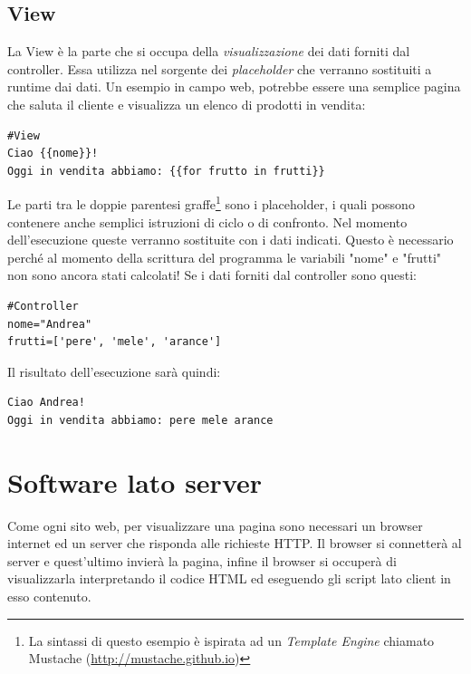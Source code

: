 \subsection{View}\label{sec:view}
La View è la parte che si occupa della \emph{visualizzazione} dei dati forniti dal controller. Essa utilizza nel sorgente dei \emph{placeholder} che verranno sostituiti a runtime dai dati.
Un esempio in campo web, potrebbe essere una semplice pagina che saluta il cliente e visualizza un elenco di prodotti in vendita:
\begin{lstlisting}
#View
Ciao {{nome}}!
Oggi in vendita abbiamo: {{for frutto in frutti}}
\end{lstlisting}
Le parti tra le doppie parentesi graffe\footnote{La sintassi di questo esempio è ispirata ad un \emph{Template Engine} chiamato Mustache (\url{http://mustache.github.io})} sono i placeholder, i quali possono contenere anche semplici istruzioni di ciclo o di confronto. Nel momento dell'esecuzione queste verranno sostituite con i dati indicati. Questo è necessario perché al momento della scrittura del programma le variabili "nome" e "frutti" non sono ancora stati calcolati!
Se i dati forniti dal controller sono questi:
\begin{lstlisting}
#Controller
nome="Andrea"
frutti=['pere', 'mele', 'arance']
\end{lstlisting}
Il risultato dell'esecuzione sarà quindi:
\begin{lstlisting}
Ciao Andrea!
Oggi in vendita abbiamo: pere mele arance
\end{lstlisting}

\section{Software lato server}\label{sec:server}
Come ogni sito web, per visualizzare una pagina sono necessari un browser internet ed un server che risponda alle richieste HTTP. Il browser si connetterà al server e quest'ultimo invierà la pagina, infine il browser si occuperà di visualizzarla interpretando il codice HTML ed eseguendo gli script lato client in esso contenuto.
